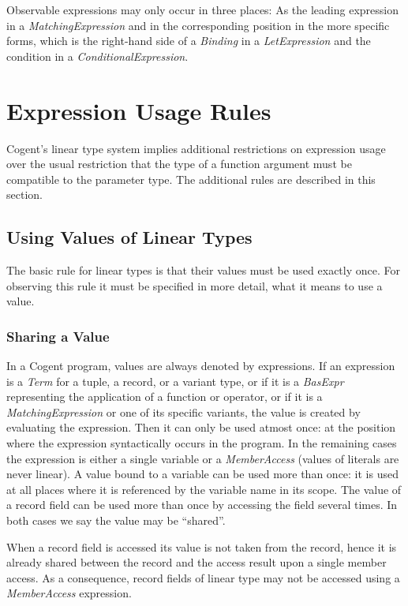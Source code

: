 \documentclass[a4paper]{report}
\newcommand{\cogent}{Cogent\xspace}
\begin{document}
Observable expressions may only occur in three places: As the leading expression in a \textit{MatchingExpression} and 
in the corresponding position in the more specific forms, which is the right-hand side of a \textit{Binding} in a 
\textit{LetExpression} and the condition in a \textit{ConditionalExpression}. 

\section{Expression Usage Rules}
\label{expr-usage}

\cogent's linear type system implies additional restrictions on expression usage over the usual restriction that
the type of a function argument must be compatible to the parameter type. The additional rules are described in 
this section.

\subsection{Using Values of Linear Types}

The basic rule for linear types is that their values must be used exactly once. For observing this rule it must 
be specified in more detail, what it means to use a value.

\subsubsection{Sharing a Value}

In a \cogent program, values are always denoted by expressions. If an expression is a \textit{Term} for a tuple, a record,
or a variant type, or if it is a \textit{BasExpr} representing the application of a function or operator, or if it is
a \textit{MatchingExpression} or one of its specific variants, the value is created by evaluating the expression. Then
it can only be used atmost once: at the position where the expression syntactically occurs in the program. In the remaining
cases the expression is either a single variable or a \textit{MemberAccess} (values of literals are never linear). 
A value 
bound to a variable can be used more than once: it is used at all places where it is referenced by
the variable name in its scope. The value of a record field can be used more than once by accessing the field
several times. In both cases we say the value may be ``shared''.

When a record field is accessed its value is not taken from the record, hence it is already shared between the record
and the access result upon a single member access. As a consequence, record fields of linear type may not be accessed
using a \textit{MemberAccess} expression.
\end{document}
